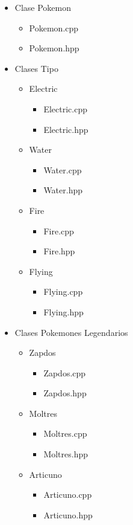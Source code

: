 \documentclass[11pt]{article}
\begin{document}
\begin{itemize}
    \item Clase Pokemon
        \begin{itemize}
             \item Pokemon.cpp
             \item Pokemon.hpp
        \end{itemize}
    \item Clases Tipo
        \begin{itemize}
             \item Electric
                \begin{itemize}
                \item Electric.cpp
                \item Electric.hpp
                 \end{itemize}
             \item Water
                \begin{itemize}
                \item Water.cpp
                \item Water.hpp
                 \end{itemize}
             \item Fire
                \begin{itemize}
                \item Fire.cpp
                \item Fire.hpp
                 \end{itemize}
             \item Flying
             \begin{itemize}
                \item Flying.cpp
                \item Flying.hpp
                 \end{itemize}
                  \end{itemize}
    \item Clases Pokemones Legendarios  
        \begin{itemize}
                \item Zapdos
                    \begin{itemize}
                    \item Zapdos.cpp
                    \item Zapdos.hpp
                    \end{itemize}
                \item Moltres
                    \begin{itemize}
                    \item Moltres.cpp
                    \item Moltres.hpp
                    \end{itemize}
                \item Articuno
                    \begin{itemize}
                    \item Articuno.cpp
                    \item Articuno.hpp
                    \end{itemize}
        \end{itemize}
       

\end{itemize}
\end{document}

